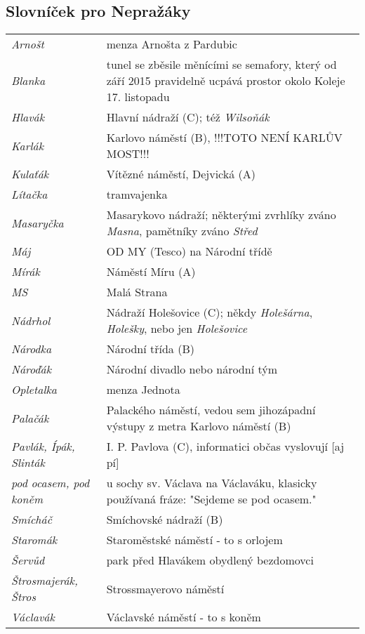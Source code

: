 \subsection{Slovníček pro Nepražáky}
\begin{longtable}{l p{8.5cm}}
    \textit{Arnošt} & menza Arnošta z Pardubic \\
    \textit{Blanka} & tunel se zběsile měnícími se semafory, který od září 2015
        pravidelně ucpává prostor okolo Koleje 17. listopadu \\
    \textit{Hlavák} & Hlavní nádraží (C); též \textit{Wilsoňák} \\
    \textit{Karlák} & Karlovo náměstí (B), !!!TOTO NENÍ KARLŮV MOST!!! \\
    \textit{Kulaťák} & Vítězné náměstí, Dejvická (A) \\
    \textit{Lítačka} & tramvajenka \\
    \textit{Masaryčka} & Masarykovo nádraží; některými zvrhlíky zváno
    \textit{Masna}, pamětníky zváno \textit{Střed} \\
    \textit{Máj} & OD MY (Tesco) na Národní třídě \\
    \textit{Mírák} & Náměstí Míru (A) \\
    \textit{MS} & Malá Strana \\
    \textit{Nádrhol} & Nádraží Holešovice (C); někdy \textit{Holešárna},
    \textit{Holešky}, nebo jen \textit{Holešovice} \\
    \textit{Národka} & Národní třída (B) \\
    \textit{Nároďák} & Národní divadlo nebo národní tým \\
    \textit{Opletalka} & menza Jednota \\
    \textit{Palačák} & Palackého náměstí, vedou sem jihozápadní výstupy z
        metra Karlovo náměstí (B) \\
    \textit{Pavlák, Ípák, Slinták} & I. P. Pavlova (C), informatici občas
        vyslovují [aj pí] \\
    \textit{pod ocasem, pod koněm} & u sochy sv. Václava na Václaváku, klasicky
        používaná fráze: "Sejdeme se pod ocasem." \\
    \textit{Smícháč} & Smíchovské nádraží (B) \\
    \textit{Staromák} & Staroměstské náměstí - to s orlojem \\
    \textit{Šervůd} & park před Hlavákem obydlený bezdomovci \\
    \textit{Štrosmajerák, Štros} & Strossmayerovo náměstí \\
    \textit{Václavák} & Václavské náměstí - to s koněm
\end{longtable}